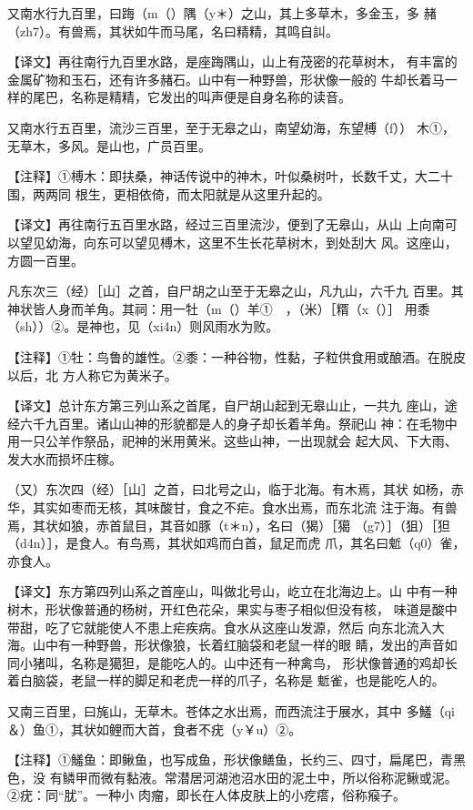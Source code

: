 \documentclass[a4paper,12pt,UTF8,twoside]{ctexbook}
\begin{document}
又南水行九百里，曰踇（m（）隅（y＊）之山，其上多草木，多金玉，多 赭（zh7）。有兽焉，其状如牛而马尾，名曰精精，其鸣自訆。

【译文】再往南行九百里水路，是座踇隅山，山上有茂密的花草树木， 有丰富的金属矿物和玉石，还有许多赭石。山中有一种野兽，形状像一般的 牛却长着马一样的尾巴，名称是精精，它发出的叫声便是自身名称的读音。

又南水行五百里，流沙三百里，至于无皋之山，南望幼海，东望榑（f）） 木①，无草木，多风。是山也，广员百里。

【注释】①榑木：即扶桑，神话传说中的神木，叶似桑树叶，长数千丈，大二十围，两两同 根生，更相依倚，而太阳就是从这里升起的。

【译文】再往南行五百里水路，经过三百里流沙，便到了无皋山，从山 上向南可以望见幼海，向东可以望见榑木，这里不生长花草树木，到处刮大 风。这座山，方圆一百里。

凡东次三（经）［山］之首，自尸胡之山至于无皋之山，凡九山，六千九 百里。其神状皆人身而羊角。其祠：用一牡（m（）羊①　，（米）［糈（x（）］ 用黍（sh））②。是神也，见（xi4n）则风雨水为败。

【注释】①牡：鸟鲁的雄性。②黍：一种谷物，性黏，子粒供食用或酿酒。在脱皮以后，北 方人称它为黄米子。

【译文】总计东方第三列山系之首尾，自尸胡山起到无皋山止，一共九 座山，途经六千九百里。诸山山神的形貌都是人的身子却长着羊角。祭祀山 神：在毛物中用一只公羊作祭品，祀神的米用黄米。这些山神，一出现就会 起大风、下大雨、发大水而损坏庄稼。

（又）东次四（经）［山］之首，曰北号之山，临于北海。有木焉，其状 如杨，赤华，其实如枣而无核，其味酸甘，食之不疟。食水出焉，而东北流 注于海。有兽焉，其状如狼，赤首鼠目，其音如豚（t＊n），名曰（猲）［獦 （g7）］（狙）［狚（d4n）］，是食人。有鸟焉，其状如鸡而白首，鼠足而虎 爪，其名曰鬿（q0）雀，亦食人。

【译文】东方第四列山系之首座山，叫做北号山，屹立在北海边上。山 中有一种树木，形状像普通的杨树，开红色花朵，果实与枣子相似但没有核， 味道是酸中带甜，吃了它就能使人不患上疟疾病。食水从这座山发源，然后 向东北流入大海。山中有一种野兽，形状像狼，长着红脑袋和老鼠一样的眼 睛，发出的声音如同小猪叫，名称是獦狚，是能吃人的。山中还有一种禽鸟， 形状像普通的鸡却长着白脑袋，老鼠一样的脚足和老虎一样的爪子，名称是 鬿雀，也是能吃人的。

又南三百里，曰旄山，无草木。苍体之水出焉，而西流注于展水，其中 多鱃（qi＆）鱼①，其状如鲤而大首，食者不疣（y￥u）②。

【注释】①鱃鱼：即鳅鱼，也写成鱼，形状像鳝鱼，长约三、四寸，扁尾巴，青黑色，没 有鳞甲而微有黏液。常潜居河湖池沼水田的泥土中，所以俗称泥鳅或泥。②疣：同“肬”。一种小 肉瘤，即长在人体皮肤上的小疙瘩，俗称瘊子。
\end{document}
